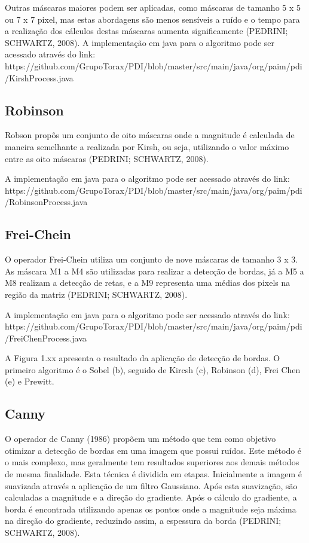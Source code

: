 \documentclass[
	12pt,				%
	oneside,			%
	a4paper,			%
	english,			%
	french,				%
	spanish,			%
	brazil,				%
	]{abntex2}
\begin{document}
Outras máscaras maiores podem ser aplicadas, como máscaras de tamanho 5 x 5 ou 7 x 7 pixel, mas estas abordagens são menos sensíveis a ruído e o tempo para a realização dos cálculos destas máscaras aumenta significamente (PEDRINI; SCHWARTZ, 2008).
 A implementação em java para o algoritmo pode ser acessado através do link:
https://github.com/GrupoTorax/PDI/blob/master/src/main/java/org/paim/pdi/KirshProcess.java 

\subsection{Robinson}
Robson propôs um conjunto de oito máscaras onde a magnitude é calculada de maneira semelhante a realizada por Kirsh, ou seja, utilizando o valor máximo entre as oito máscaras (PEDRINI; SCHWARTZ, 2008). 

 A implementação em java para o algoritmo pode ser acessado através do link:
https://github.com/GrupoTorax/PDI/blob/master/src/main/java/org/paim/pdi/RobinsonProcess.java 

\subsection{Frei-Chein}
O operador Frei-Chein utiliza um conjunto de nove máscaras de tamanho 3 x 3. As máscara M1 a M4 são utilizadas para realizar a detecção de bordas, já a M5 a M8 realizam a detecção de retas, e a M9 representa uma médias dos pixels na região da matriz (PEDRINI; SCHWARTZ, 2008). 

 A implementação em java para o algoritmo pode ser acessado através do link:
https://github.com/GrupoTorax/PDI/blob/master/src/main/java/org/paim/pdi/FreiChenProcess.java 

A Figura 1.xx apresenta o resultado da aplicação de detecção de bordas. O primeiro algoritmo é o Sobel (b), seguido de Kircsh (c), Robinson (d), Frei Chen (e) e Prewitt.

\subsection{Canny}
O operador de Canny (1986) propõem um método que tem como objetivo otimizar a detecção de bordas em uma imagem que possui ruídos. Este método é o mais complexo, mas geralmente tem resultados superiores aos demais métodos de mesma finalidade. Esta técnica é dividida em etapas. Inicialmente a imagem é suavizada através a aplicação de um filtro Gaussiano. Após esta suavização, são calculadas a magnitude e a direção do gradiente. Após o cálculo do gradiente, a borda é encontrada utilizando apenas os pontos onde a magnitude seja máxima na direção do gradiente, reduzindo assim, a espessura da borda (PEDRINI; SCHWARTZ, 2008).
\end{document}
